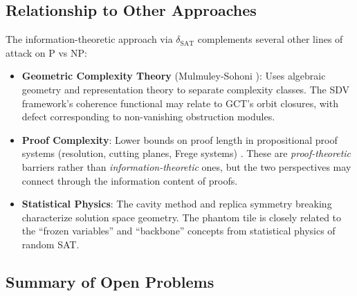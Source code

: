 \documentclass[11pt]{article}
\theoremstyle{definition}
\theoremstyle{remark}
\newcommand{\dSAT}{\delta_{\mathrm{SAT}}}
\begin{document}
\subsection{Relationship to Other Approaches}

The information-theoretic approach via $\dSAT$ complements several other
lines of attack on P vs NP:

\begin{itemize}
  \item \textbf{Geometric Complexity Theory} (Mulmuley-Sohoni \cite{GCT}):
    Uses algebraic geometry and representation theory to separate complexity
    classes.  The SDV framework's coherence functional may relate to
    GCT's orbit closures, with defect corresponding to non-vanishing
    obstruction modules.

  \item \textbf{Proof Complexity}: Lower bounds on proof length in
    propositional proof systems (resolution, cutting planes, Frege systems)
    \cite{BPR97}.  These are \emph{proof-theoretic} barriers rather than
    \emph{information-theoretic} ones, but the two perspectives may connect
    through the information content of proofs.

  \item \textbf{Statistical Physics}: The cavity method and replica symmetry
    breaking \cite{MPZ} characterize solution space geometry.  The phantom
    tile is closely related to the ``frozen variables'' and ``backbone''
    concepts from statistical physics of random SAT.
\end{itemize}

\subsection{Summary of Open Problems}
\end{document}
